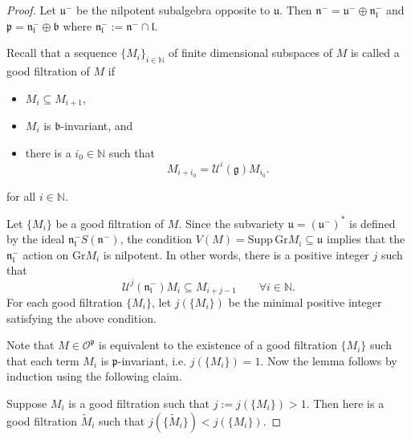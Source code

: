 \documentclass{amsart}[12pt]
\def\fbb{\mathfrak{b}}
\def\fnn{\mathfrak{n}}
\def\fpp{\mathfrak{p}}
\def\fuu{\mathfrak{u}}
\def\fll{\mathfrak{l}}
\def\fbb{\mathfrak{b}}
\def\fgg{\mathfrak{g}}
\def\cU{\mathcal{U}}
\def\tM{\widetilde{M}}
\def\Gr{\mathrm{Gr}}
\renewcommand{\subset}{\subseteq}
\numberwithin{equation}{section}
\begin{document}
\begin{proof}
	\def\fnlm{\fnn_\fll^-}
	\def\fnm{\fnn^-}
	\def\Supp{\mathrm{Supp}}
	\def\bN{\mathbb{N}}
	\def\sO{\mathscr{O}}
	Let $\fuu^-$ be the nilpotent subalgebra opposite to $\fuu$. 
	Then $\fnn^- = \fuu^- \oplus \fnn_\fll^-$ and $\fpp = \fnlm \oplus \fbb$ where
	$\fnn_\fll^- := \fnn^- \cap \fll$. 

	Recall that a sequence $\{M_i\}_{i\in \bN}$ %
	of finite dimensional subspaces of $M$ is called a  good filtration of $M$ if  
	\begin{itemize}
	\item  $M_i\subset M_{i+1}$, 
	\item $M_i$ is $\fbb$-invariant, and %
	\item there is a $i_0\in \bN$ such that 
	\[
	M_{i+i_0} = \cU^i(\fgg)M_{i_0}. %
	\]
	\end{itemize}
	for all $i\in \bN$. 

	Let $\{M_i\}$ be a good filtration of $M$. 
	Since the subvariety $\fuu = (\fuu^-)^*$ is defined
	by the ideal $\fnn_\fll^- S(\fnn^-)$,  
	the condition $V(M) = \Supp\, \Gr M_i   \subset \fuu$
	implies that the $\fnn_\fll^-$ action on $\Gr M_i$ is nilpotent. 
	In other words, there
	is a positive integer $j$ such that 
	\[
		\cU^j(\fnn_\fll^-) M_i \subset M_{i+j-1} \qquad \forall i\in \bN. 
	\] 
	For each good filtration $\{M_i\}$,  
	let $j(\{M_i\})$ be the minimal positive integer satisfying the above condition.

	
    Note that $M\in \sO^\fpp$ is equivalent to the existence of a good filtration $\{M_i\}$ such 
	that each term $M_i$ is $\fpp$-invariant, i.e. $j(\{M_i\}) = 1$. 
	Now the lemma follows by induction using the following claim. 

	 Suppose $M_i$ is a good filtration such that 
	$j:=j(\{M_i\})>1$. Then here is a good filtration $\tM_i$ such that $j(\{\tM_i\}) < j(\{M_i\})$.


\end{proof}
\end{document}
